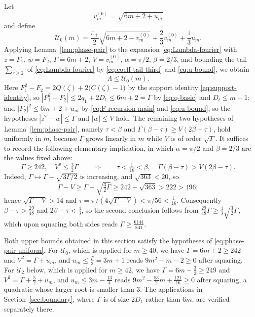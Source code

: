 \documentclass[11pt]{article}
\theoremstyle{definition}
\theoremstyle{remark}
\numberwithin{equation}{section}
\begin{document}
Let
\[
  v_m^{(0)}=\sqrt{6m+2+u_m}
\]
and define
\begin{equation}\label{eq:U0}
  \mathcal U_0(m)=
  \frac{\pi_+}{2}\sqrt{6m+2-v_m^{(0)}}
  +\frac23v_m^{(0)}+\frac13u_m.
\end{equation}
Applying Lemma~\ref{lem:phase-pair} to the expansion \eqref{eq:Lambda-fourier} with $z=F_1$, $w=F_2$, $\Gamma=6m+2$, $V=v_m^{(0)}$, $\alpha=\pi/2$, $\beta=2/3$, and bounding the tail $\sum_{r\ge2}$ of \eqref{eq:Lambda-fourier} by \eqref{eq:coeff-tail-third} and \eqref{eq:u-bound}, we obtain
\[
  \Lambda\le\mathcal U_0(m).
\]
Here $F_1^2-F_2=2Q(\zeta)+2\bigl(C(\zeta)-1\bigr)$ by the support identity \eqref{eq:support-identity}, so $|F_1^2-F_2|\le2q_1+2D_1\le6m+2=\Gamma$ by \eqref{eq:q-basic} and $D_t\le m+1$; and $|F_2|^2\le6m+2+u_m$ by \eqref{eq:F-recursion-main} and \eqref{eq:u-bound}, so the hypotheses $|z^2-w|\le \Gamma$ and $|w|\le V$ hold. The remaining two hypotheses of Lemma~\ref{lem:phase-pair}, namely $\tau<\beta$ and $\Gamma(\beta-\tau)\ge V(2\beta-\tau)$, hold uniformly in $m$, because $\Gamma$ grows linearly in $m$ while $V$ is of order $\sqrt \Gamma$. It suffices to record the following elementary implication, in which $\alpha=\pi/2$ and $\beta=2/3$ are the values fixed above:
\begin{equation}\label{eq:phase-pair-uniform}
  \Gamma\ge242,\quad V^2\le\tfrac32\Gamma
  \qquad\Longrightarrow\qquad
  \tau<\tfrac1{16}<\beta,\quad \Gamma(\beta-\tau)>V(2\beta-\tau).
\end{equation}
Indeed, $\Gamma\mapsto \Gamma-\sqrt{3\Gamma/2}$ is increasing, and $\sqrt{363}<20$, so
\[
  \Gamma-V\ge \Gamma-\sqrt{\tfrac32\Gamma}\ge242-\sqrt{363}>222>196 ;
\]
hence $\sqrt{\Gamma-V}>14$ and $\tau=\pi/(4\sqrt{\Gamma-V})<\pi/56<\tfrac1{16}$. Consequently $\beta-\tau>\tfrac{29}{48}$ and $2\beta-\tau<\tfrac43$, so the second conclusion follows from $\tfrac{29}{48}\Gamma\ge\tfrac43\sqrt{\tfrac32\Gamma}$, which upon squaring both sides reads $\Gamma\ge\tfrac{6144}{841}$.

Both upper bounds obtained in this section satisfy the hypotheses of \eqref{eq:phase-pair-uniform}. For $\mathcal U_0$, which is applied for $m\ge40$, we have $\Gamma=6m+2\ge242$ and $V^2=\Gamma+u_m$, and $u_m\le\tfrac\Gamma2=3m+1$ reads $9m^2-m-2\ge0$ after squaring. For $\mathcal U_2$ below, which is applied for $m\ge42$, we have $\Gamma=6m-\tfrac32\ge249$ and $V^2=\Gamma+\tfrac52+u_m$, and $u_m\le3m-\tfrac{13}4$ reads $9m^2-\tfrac{53}2m+\tfrac{121}{16}\ge0$ after squaring, a quadratic whose larger root is smaller than $3$. The applications in Section~\ref{sec:boundary}, where $\Gamma$ is of size $2D_1$ rather than $6m$, are verified separately there.
\end{document}
